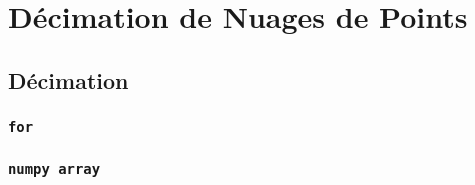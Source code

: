 \documentclass[../CSC_5RO17_TA_TP4.tex]{subfiles}
\begin{document}
\section{Décimation de Nuages de Points}
\subsection{Décimation}
\subsubsection{\texttt{for}}
\subsubsection{\texttt{numpy array}}
\end{document}
